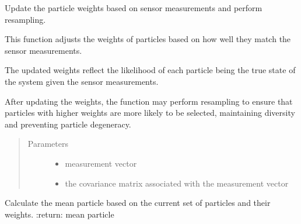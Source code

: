 \documentclass[letterpaper,10pt,english]{sphinxmanual}
\begin{document}
\begin{fulllineitems}
\begin{fulllineitems}
\end{fulllineitems}


\begin{fulllineitems}
\label{\detokenize{particle_filter:ParticleFilter.ParticleFilter.Update}}
\sphinxAtStartPar
Update the particle weights based on sensor measurements and perform resampling.

\sphinxAtStartPar
This function adjusts the weights of particles based on how well they match the sensor measurements.

\sphinxAtStartPar
The updated weights reflect the likelihood of each particle being the true state of the system given
the sensor measurements.

\sphinxAtStartPar
After updating the weights, the function may perform resampling to ensure that particles with higher
weights are more likely to be selected, maintaining diversity and preventing particle degeneracy.
\begin{quote}\begin{description}
\item[{Parameters}] \leavevmode\begin{itemize}
\item {} 
\sphinxAtStartPar
{} \textendash{} measurement vector

\item {} 
\sphinxAtStartPar
{} \textendash{} the covariance matrix associated with the measurement vector

\end{itemize}

\end{description}\end{quote}

\end{fulllineitems}


\begin{fulllineitems}
\label{\detokenize{particle_filter:ParticleFilter.ParticleFilter.get_mean_particle}}
\sphinxAtStartPar
Calculate the mean particle based on the current set of particles and their weights.
:return: mean particle


\end{fulllineitems}
\end{fulllineitems}
\end{document}
